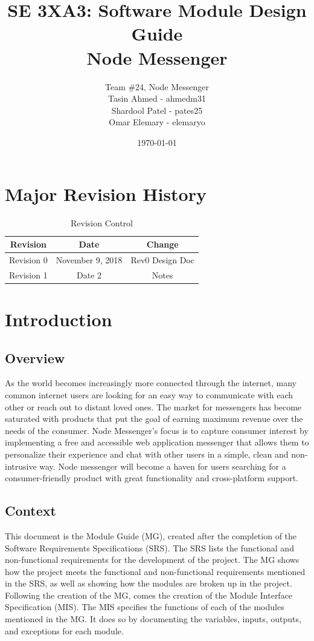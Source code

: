 \documentclass[12pt, titlepage]{article}
\title{SE 3XA3: Software Module Design Guide\\Node Messenger}
\author{Team \#24, Node Messenger
		\\ Tasin Ahmed - ahmedm31
		\\ Shardool Patel - pates25
		\\ Omar Elemary - elemaryo
}
\date{\today}
\begin{document}
\maketitle

\tableofcontents
\listoftables
\listoffigures

\section{Major Revision History}
\begin{table}[h!]
\centering
\begin{tabular}{ccc}
\hline 
Revision & Date & Change \\ 
\hline 
Revision 0 & November 9, 2018 & Rev0 Design Doc \\ 
Revision 1 & Date 2 & Notes \\ 
\hline 
\end{tabular} 
\caption{Revision Control}
\label{my-label}
\end{table}


\section{Introduction}
\subsection{Overview}
As the world becomes increasingly more connected through the internet, many common internet users are looking for an easy way to communicate with each other or reach out to distant loved ones. The market for messengers has become saturated with products that put the goal of earning maximum revenue over the needs of the consumer. Node Messenger's focus is to capture consumer interest by implementing a free and accessible web application messenger that allows them to personalize their experience and chat with other users in a simple, clean and non-intrusive way. Node messenger will become a haven for users searching for a consumer-friendly product with great functionality and cross-platform support.

\subsection{Context}
This document is the Module Guide (MG), created after the completion of the Software Requirements Specifications (SRS). The SRS lists the functional and non-functional requirements for the development of the project. The MG shows how the project meets the functional and non-functional requirements mentioned in the SRS, as well as showing how the modules are broken up in the project. Following the creation of the MG, comes the creation of the Module Interface Specification (MIS). The MIS specifies the functions of each of the modules mentioned in the MG. It does so by documenting the variables, inputs, outputs, and exceptions for each module. 
\end{document}
